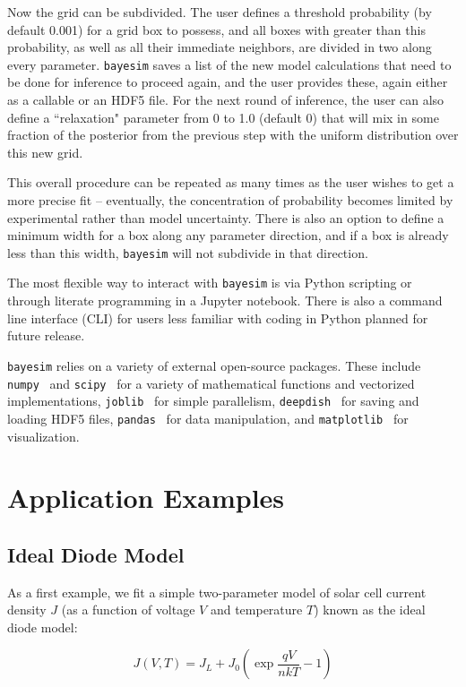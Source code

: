 \documentclass[aps,prl,amsmath,amssymb,superscriptaddress,notitlepage,groupedaddress]{revtex4-1}
\begin{document}
  Now the grid can be subdivided. The user defines a threshold probability (by default 0.001) for a grid box to possess, and all boxes with greater than this probability, as well as all their immediate neighbors, are divided in two along every parameter. \texttt{bayesim} saves a list of the new model calculations that need to be done for inference to proceed again, and the user provides these, again either as a callable or an HDF5 file. For the next round of inference, the user can also define a ``relaxation" parameter from 0 to 1.0 (default 0) that will mix in some fraction of the posterior from the previous step with the uniform distribution over this new grid.

  This overall procedure can be repeated as many times as the user wishes to get a more precise fit -- eventually, the concentration of probability becomes limited by experimental rather than model uncertainty. There is also an option to define a minimum width for a box along any parameter direction, and if a box is already less than this width, \texttt{bayesim} will not subdivide in that direction.

  The most flexible way to interact with \texttt{bayesim} is via Python scripting or through literate programming in a Jupyter notebook. There is also a command line interface (CLI) for users less familiar with coding in Python planned for future release.

  \texttt{bayesim} relies on a variety of external open-source packages. These include \texttt{numpy}~\cite{numpy} and \texttt{scipy}~\cite{scipy} for a variety of mathematical functions and vectorized implementations, \texttt{joblib}~\cite{joblib} for simple parallelism, \texttt{deepdish}~\cite{deepdish} for saving and loading HDF5 files, \texttt{pandas}~\cite{pandas} for data manipulation, and \texttt{matplotlib}~\cite{mpl} for visualization.

\section*{Application Examples}
  \subsection{Ideal Diode Model}
    As a first example, we fit a simple two-parameter model of solar cell current density $J$ (as a function of voltage $V$ and temperature $T$) known as the ideal diode model:

    \begin{equation}
      J(V,T) = J_L+J_0\left(\exp{\frac{qV}{nkT}}-1\right)
      \label{ID_eqn}
    \end{equation}
\end{document}
